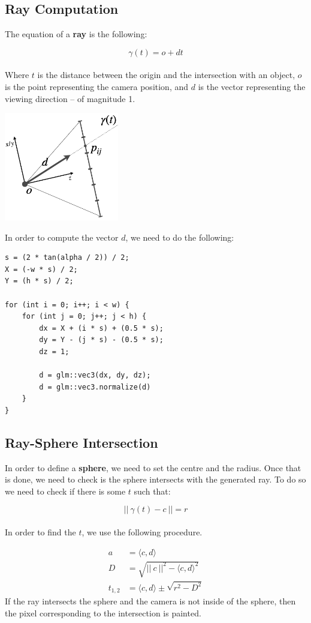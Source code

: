 \documentclass{article}
\begin{document}
\subsection{Ray Computation}
The equation of a \textbf{ray} is the following:

\[ \gamma(t) = o + dt \] \\
Where $t$ is the distance between the origin and the intersection with an object, $o$ is the point representing the camera position, and $d$ is the vector representing the viewing direction -- of magnitude 1.

\begin{center}
	\includegraphics[width=5cm]{ray_comp.png}
\end{center} 
In order to compute the vector $d$, we need to do the following:

\begin{lstlisting}[style=c++]
s = (2 * tan(alpha / 2)) / 2;
X = (-w * s) / 2;
Y = (h * s) / 2;

for (int i = 0; i++; i < w) {
	for (int j = 0; j++; j < h) {
		dx = X + (i * s) + (0.5 * s);
		dy = Y - (j * s) - (0.5 * s);
		dz = 1;
		
		d = glm::vec3(dx, dy, dz);
		d = glm::vec3.normalize(d)
	}
}
\end{lstlisting}

\subsection{Ray-Sphere Intersection}
In order to define a \textbf{sphere}, we need to set the centre and the radius. Once that is done, we need to check is the sphere intersects with the generated ray. To do so we need to check if there is some $t$ such that:

\[ ||~\gamma(t) - c~|| = r \] \\
In order to find the $t$, we use the following procedure.

\begin{align*}
	a & = \langle c, d \rangle \\
	D & = \sqrt{||~c~||^2 - \langle c, d \rangle^2} \\
	t_{1,2} & = \langle c,d \rangle \pm \sqrt{r^2 - D^2}
\end{align*}
If the ray intersects the sphere and the camera is not inside of the sphere, then the pixel corresponding to the intersection is painted.
\end{document}
